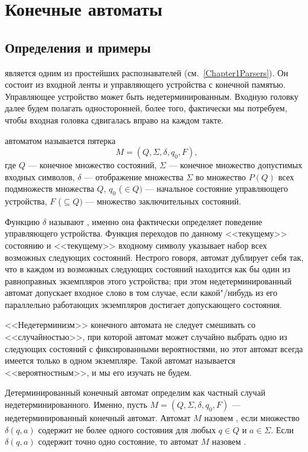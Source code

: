 \chapter{Конечные автоматы}
\label{Chapter3}

\section{Определения и примеры}
\label{Chapter3Defines}

 является одним из простейших
распознавателей (см.~\ref{Chapter1Parsers}). Он состоит из входной ленты и
управляющего устройства с конечной памятью. Управляющее
устройство может быть недетерминированным. Входную
головку далее будем полагать односторонней, более того,
фактически мы потребуем, чтобы входная головка сдвигалась
вправо на каждом такте.

 автоматом называется пятерка
\[
    M = (Q,\Sigma, \delta, q_0, F),
\]
где $Q$ --- конечное множество состояний, $\Sigma$ --- конечное
множество допустимых входных символов, $\delta$ --- отображение
множества $\Sigma$ во множество $P(Q)$ всех подмножеств множества $Q$,
$q_0$ ($\in Q)$ --- начальное состояние управляющего устройства,
$F$ ($\subseteq Q)$ --- множество заключительных состояний.

Функцию $\delta$ называют , именно она
фактически определяет поведение управляющего устройства. Функция
переходов по данному <<текущему>> состоянию и <<текущему>> входному
символу указывает набор всех возможных следующих состояний. Нестрого
говоря, автомат дублирует себя так, что в каждом из возможных следующих
состояний находится как бы один из равноправных экземпляров этого
устройства; при этом недетерминированный автомат допускает входное
слово в том случае, если какой"/нибудь из его параллельно работающих
экземпляров достигает допускающего состояния.

<<Недетерминизм>> конечного автомата не следует смешивать со
<<случайностью>>, при которой автомат может случайно выбрать одно из
следующих состояний с фиксированными вероятностями, но этот автомат
всегда имеется только в одном экземпляре. Такой автомат называется
<<вероятностным>>, и мы его изучать не будем.

Детерминированный конечный автомат определим как частный случай
недетерминированного. Именно, пусть $M = (Q,\Sigma,
\delta, q_0, F)$ --- недетерминированный конечный автомат. Автомат $M$
назовем , если множество $\delta(q,a)$
содержит не
более одного состояния для любых $q\in Q$ и $a\in\Sigma$. Если
$\delta(q,a)$ содержит точно одно состояние, то автомат $M$ назовем
.

